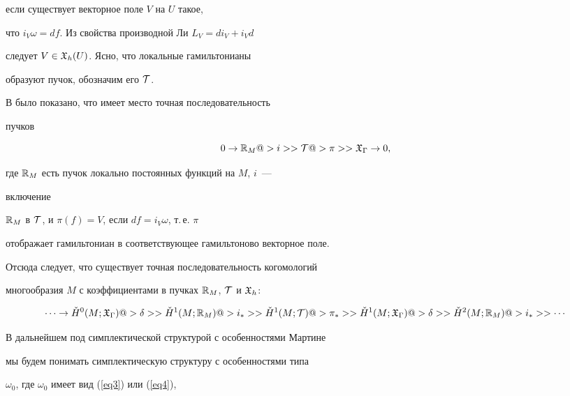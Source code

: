 если существует векторное поле $V$ на $U$ такое,


что $i_V\omega = df$. Из свойства производной Ли $L_V = d i_V + i_V d$


следует $V \in {\frak X}_h(U)$. Ясно, что локальные гамильтонианы


образуют пучок, обозначим его ${\cal T}$.





В \cite{MA} было показано, что имеет место точная последовательность


пучков


$$


0 \to \R_M @>i>> \cT @>{\pi}>> \gX_\Gamma \to 0,


$$


где ${\Bbb R}_M$ есть пучок локально постоянных функций на $M$, $i$~---


включение


${\Bbb R}_M$ в ${\cal T}$, и $\pi(f) = V$, если $df = i_V \omega$, т.\,е. $\pi$


отображает гамильтониан в соответствующее гамильтоново векторное поле.


Отсюда следует, что существует точная последовательность когомологий


многообразия $M$ с коэффициентами в пучках ${\Bbb R}_M$, ${\cal T}$ и ${\frak X}_h$:


\begin{equation} \label{eq7}


\dotsb \to


\check H^0(M;\gX_\Gamma) @>{\delta}>>


\check H^1(M;\R_M) @>{i_*}>>


\check H^1(M;\cT) @>{\pi_*}>>






\check H^1(M;\gX_\Gamma) @>{\delta}>>


\check H^2(M;\R_M) @>{i_*}>> \dotsb


\end{equation}





В дальнейшем под симплектической структурой с особенностями Мартине


мы будем понимать симплектическую структуру с особенностями типа


$\omega_0$, где $\omega_0$ имеет вид (\ref{eq3}) или (\ref{eq4}),


